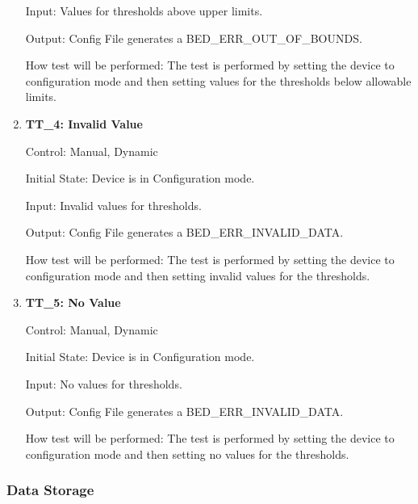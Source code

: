\documentclass[12pt, titlepage]{article}
\begin{document}
\begin{enumerate}
		Input: Values for thresholds above upper limits.
		
		Output: Config File generates a BED\_ERR\_OUT\_OF\_BOUNDS.
		
		How test will be performed: The test is performed by setting the device to configuration mode and then setting values for the thresholds below allowable limits.

	\item{\textbf{TT\_4: Invalid Value} \\}\label{TT4}
	
		Control: Manual, Dynamic
							
		Initial State: Device is in Configuration mode.
							
		Input: Invalid values for thresholds.
		
		Output: Config File generates a BED\_ERR\_INVALID\_DATA.
		
		How test will be performed: The test is performed by setting the device to configuration mode and then setting invalid values for the thresholds.

	\item{\textbf{TT\_5: No Value} \\}\label{TT5}
	
		Control: Manual, Dynamic
							
		Initial State: Device is in Configuration mode.
							
		Input: No values for thresholds.
		
		Output: Config File generates a BED\_ERR\_INVALID\_DATA.

		How test will be performed: The test is performed by setting the device to configuration mode and then setting no values for the thresholds.
\end{enumerate}
\pagebreak
\subsubsection{Data Storage}
\end{document}

